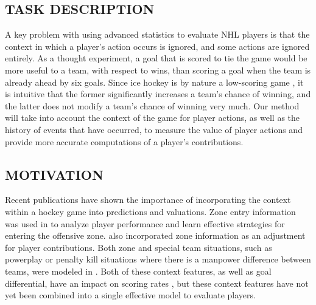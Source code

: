 \documentclass[]{article}
\begin{document}

\subsection{TASK DESCRIPTION}

A key problem with using advanced statistics to evaluate NHL players is that the context in which a player's action occurs is ignored, and some actions are ignored entirely. As a thought experiment, a goal that is scored to tie the game would be more useful to a team, with respect to wins, than scoring a goal when the team is already ahead by six goals. Since ice hockey is by nature a low-scoring game \citep{Lock2009}, it is intuitive that the former significantly increases a team's chance of winning, and the latter does not modify a team's chance of winning very much. Our method will take into account the context of the game for player actions, as well as the history of events that have occurred, to measure the value of player actions and provide more accurate computations of a player's contributions.


\subsection{MOTIVATION}

Recent publications have shown the importance of incorporating the context within a hockey game into predictions and valuations. Zone entry information was used in \citep{Tulsky2013} to analyze player performance and learn effective strategies for entering the offensive zone. \citep{Schuckers2013} also incorporated zone information as an adjustment for player contributions. Both zone and special team situations, such as powerplay or penalty kill situations where there is a manpower difference between teams, were modeled in \citep{Macdonald2012}. Both of these context features, as well as goal differential, have an impact on scoring rates \citep{Thomas2012}, but these context features have not yet been combined into a single effective model to evaluate players.
\end{document}
